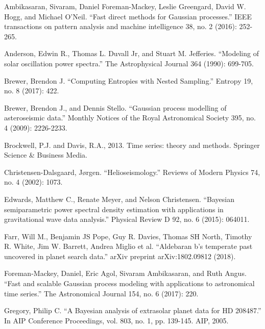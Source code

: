\documentclass[a4paper, 12pt]{article}
\begin{document}
\begin{thebibliography}{999}

Ambikasaran, Sivaram, Daniel Foreman-Mackey, Leslie Greengard, David W. Hogg, and Michael O’Neil. ``Fast direct methods for Gaussian processes.''
IEEE transactions on pattern analysis and machine intelligence 38, no. 2 (2016): 252-265.

Anderson, Edwin R., Thomas L. Duvall Jr, and Stuart M. Jefferies. ``Modeling of solar oscillation power spectra.'' The Astrophysical Journal 364 (1990): 699-705.

Brewer, Brendon J. ``Computing Entropies with Nested Sampling.'' Entropy 19, no. 8 (2017): 422.

Brewer, Brendon J., and Dennis Stello. ``Gaussian process modelling of asteroseismic data.'' Monthly Notices of the Royal Astronomical Society 395, no. 4 
(2009): 2226-2233.

Brockwell, P.J. and Davis, R.A., 2013. Time series: theory and methods. Springer Science \& Business Media.

Christensen-Dalsgaard, Jørgen. ``Helioseismology.'' Reviews of Modern Physics 74, no. 4 (2002): 1073.

Edwards, Matthew C., Renate Meyer, and Nelson Christensen.
``Bayesian semiparametric power spectral density estimation with applications
in gravitational wave data analysis.'' Physical Review D 92, no. 6 (2015): 064011.

Farr, Will M., Benjamin JS Pope, Guy R. Davies, Thomas SH North, Timothy R. White, Jim W. Barrett, Andrea Miglio et al. ``Aldebaran b's temperate past uncovered in planet search data.'' arXiv preprint arXiv:1802.09812 (2018).

Foreman-Mackey, Daniel, Eric Agol, Sivaram Ambikasaran, and Ruth Angus. ``Fast and scalable Gaussian process modeling with applications to astronomical time series.'' The Astronomical Journal 154, no. 6 (2017): 220.

Gregory, Philip C.
``A Bayesian analysis of extrasolar planet data for HD 208487.''
In AIP Conference Proceedings, vol. 803, no. 1, pp. 139-145. AIP, 2005.


\end{thebibliography}
\end{document}

